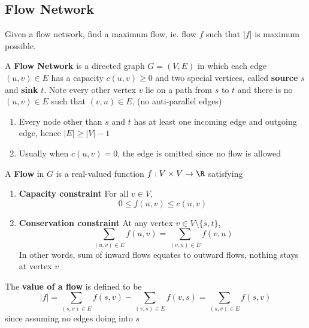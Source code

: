 \documentclass[11pt]{article}
\begin{document}
\subsection*{Flow Network}

Given a flow network, find a maximum flow, ie. flow $f$ such that $|f|$ is maximum possible.

\begin{defn*}
  A \textbf{Flow Network} is a directed graph $G = (V, E)$ in which each edge $(u,v)\in E$ has a capacity $c(u,v) \geq 0$ and two special vertices, called \textbf{source} $s$ and \textbf{sink} $t$. Note every other vertex $v$ lie on a path from $s$ to $t$ and there is no $(u,v)\in E$ such that $(v,u) \in E$, (no anti-parallel edges)
  \begin{enumerate}
    \item Every node other than $s$ and $t$ has at least one incoming edge and outgoing edge, hence $|E| \geq |V| - 1$
    \item Usually when $c(u,v) =0$, the edge is omitted since no flow is allowed
  \end{enumerate}
\end{defn*}

\begin{defn*}
  A \textbf{Flow} in $G$ is a real-valued function $f: V\times V \to \R$ satisfying
  \begin{enumerate}
    \item \textbf{Capacity constraint} For all $v\in V$,
    \[
      0 \leq f(u,v) \leq c(u,v)
    \]
    \item \textbf{Conservation constraint} At any vertex $v\in V \setminus \{s, t \}$,
    \[
      \sum_{(u,v)\in E}f(u,v) = \sum_{(v, u) \in E} f(v, u)
    \]
    In other words, sum of inward flows equates to outward flows, nothing stays at vertex $v$
  \end{enumerate}
  The \textbf{value of a flow} is defined to be
  \[
    |f| = \sum_{(s,  v) \in E} f(s, v) - \sum_{(v, s)\in E} f(v, s) = \sum_{(s,  v) \in E} f(s, v)
  \]
  since assuming no edges doing into $s$
\end{defn*}
\end{document}

